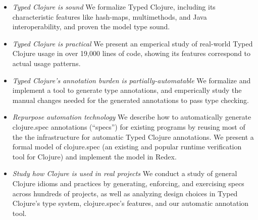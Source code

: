 \documentclass[9pt]{extarticle}
\begin{document}
\begin{itemize}
  \item \emph{Typed Clojure is sound} We formalize Typed Clojure, including
    its characteristic features like hash-maps, multimethods, and Java interoperability,
    and proven the model type sound.
  \item \emph{Typed Clojure is practical} We present an emperical study of real-world Typed Clojure usage
    in over 19,000 lines of code, showing its features correspond to actual usage patterns.
  \item \emph{Typed Clojure's annotation burden is partially-automatable} We formalize and implement a tool to generate
    type annotations, and emperically study the manual changes needed for the generated annotations
    to pass type checking.
  \item \emph{Repurpose automation technology}
    We describe how to automatically generate clojure.spec annotations (``specs'') for existing programs by reusing
    most of the the infrastructure for automatic Typed Clojure annotations.
    We present a formal model of clojure.spec (an existing and popular runtime verification tool for Clojure)
    and implement the model in Redex.
  \item \emph{Study how Clojure is used in real projects}
    We conduct a study of general Clojure idioms and practices by generating, enforcing, and exercising specs
    across hundreds of projects, as well as analyzing design choices in Typed Clojure's type system,
    clojure.spec's features, and our automatic annotation tool.


\end{itemize}
\end{document}
